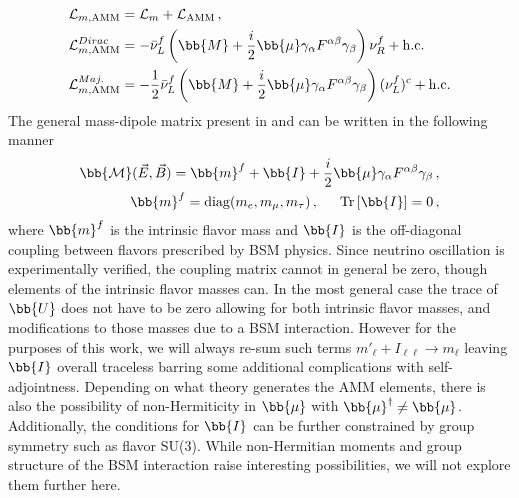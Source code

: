 \begin{alignat}{1}
	\label{mass:eq:05a} \mathcal{L}_{m,\mathrm{AMM}} &= \mathcal{L}_{m} + \mathcal{L}_{\mathrm{AMM}}\,,\\
	\label{mass:eq:05b} \mathcal{L}_{m,\mathrm{AMM}}^{Dirac} &= -\bar{\nu}^{f}_{L}\left(\bb{M} + \frac{i}{2}\bb{\mu}\gamma_{\alpha}F^{\alpha\beta}\gamma_{\beta}\right)\nu^{f}_{R}+\mathrm{h.c.}\\
	\label{mass:eq:05c} \mathcal{L}_{m,\mathrm{AMM}}^{Maj.} &= -\frac{1}{2}\bar{\nu}^{f}_{L}\left(\bb{M} + \frac{i}{2}\bb{\mu}\gamma_{\alpha}F^{\alpha\beta}\gamma_{\beta}\right)(\nu^{f}_{L})^{c}+\mathrm{h.c.}
\end{alignat}
The general mass-dipole matrix present in  and  can be written in the following manner
\begin{alignat}{1}
	\label{mass:eq:06a} {\bb{\mathcal{M}}}(\vec{E},\vec{B}) = \bb{m}^{f} + \bb{I} + \frac{i}{2}\bb{\mu}\gamma_{\alpha}F^{\alpha\beta}\gamma_{\beta}\,,\\
	\label{mass:eq:06b} \bb{m}^{f} = \mathrm{diag}(m_{e},m_{\mu},m_{\tau})\,,\indent\mathrm{Tr}\left[\bb{I}\right] = 0 \,,
\end{alignat}
where $\bb{m}^{f}$ is the intrinsic flavor mass and $\bb{I}$ is the off-diagonal coupling between flavors prescribed by BSM physics. Since neutrino oscillation is experimentally verified, the coupling matrix cannot in general be zero, though elements of the intrinsic flavor masses can. In the most general case the trace of $\bb{U}$ does not have to be zero allowing for both intrinsic flavor masses, and modifications to those masses due to a BSM interaction. However for the purposes of this work, we will always re-sum such terms $m'_{\ell}+I_{\ell\ell}\rightarrow m_{\ell}$ leaving $\bb{I}$ overall traceless barring some additional complications with self-adjointness. Depending on what theory generates the AMM elements, there is also the possibility of non-Hermiticity in $\bb{\mu}$ with $\bb{\mu}^{\dagger}\neq\bb{\mu}$. Additionally, the conditions for $\bb{I}$ can be further constrained by group symmetry such as flavor SU(3). While non-Hermitian moments and group structure of the BSM interaction raise interesting possibilities, we will not explore them further here. 

